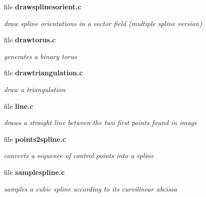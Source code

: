 \begin{CompactItemize}
\item 
file {\bf drawsplinesorient.c}
\begin{CompactList}\small\item\em draw spline orientations in a vector field (multiple spline version) \item\end{CompactList}

\item 
file {\bf drawtorus.c}
\begin{CompactList}\small\item\em generates a binary torus \item\end{CompactList}

\item 
file {\bf drawtriangulation.c}
\begin{CompactList}\small\item\em draw a triangulation \item\end{CompactList}

\item 
file {\bf line.c}
\begin{CompactList}\small\item\em draws a straight line between the two first points found in image \item\end{CompactList}

\item 
file {\bf points2spline.c}
\begin{CompactList}\small\item\em converts a sequence of control points into a spline \item\end{CompactList}

\item 
file {\bf samplespline.c}
\begin{CompactList}\small\item\em samples a cubic spline according to its curvilinear abcissa \item\end{CompactList}

\end{CompactItemize}
